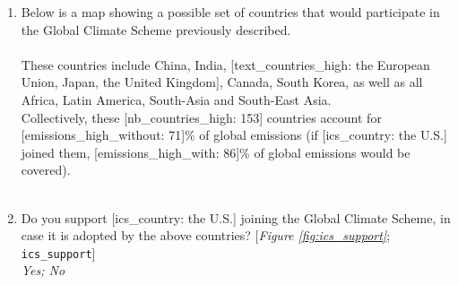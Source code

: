 \begin{enumerate}[resume]
\item  \label{q:gcs_high} Below is a map showing a possible set of countries that would participate in the Global Climate Scheme previously described.\\
\\
These countries include China, India, [text\_countries\_high: the European Union, Japan, the United Kingdom], Canada, South Korea, as well as all Africa, Latin America, South-Asia and South-East Asia.\~\\
Collectively, these [nb\_countries\_high: 153] countries account for [emissions\_high\_without: 71]\% of global emissions (if [ics\_country: the U.S.] joined them, [emissions\_high\_with: 86]\% of global emissions would be covered).\\
\\ [\textit{Figure \ref{fig:gcs_high}}; 
\verb|gcs_high|]


\item  \label{q:ics_support} Do you support [ics\_country: the U.S.] joining the Global Climate Scheme, in case it is adopted by the above countries? [\textit{Figure \ref{fig:ics_support}}; 
\verb|ics_support|]
  \\ \textit{Yes; No}

\end{enumerate} 

